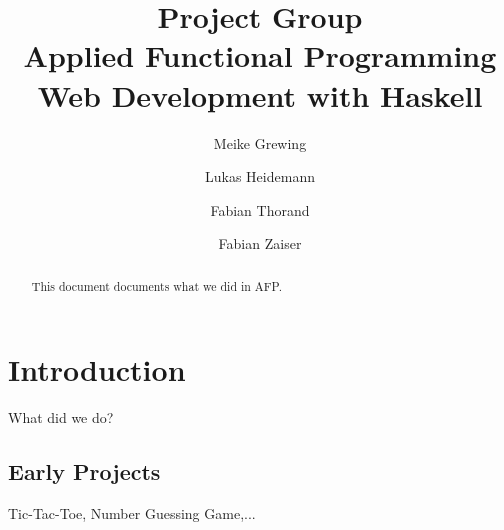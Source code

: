 \documentclass[a4paper]{easychair}
\begin{document}
%
\title{Project Group\\ Applied Functional Programming\\
       \large{Web Development with Haskell}}



%
\author{
  Meike Grewing
\and
  Lukas Heidemann
\and
  Fabian Thorand
\and 
  Fabian Zaiser\\
}




\clearpage

\maketitle

\begin{abstract}
This document documents what we did in AFP.
\end{abstract}

\setcounter{tocdepth}{2}

\pagestyle{empty}


\section{Introduction}
\label{sect:intro}
What did we do?

\subsection{Early Projects}
\label{sect:early-projects}
Tic-Tac-Toe, Number Guessing Game,...
\end{document}
